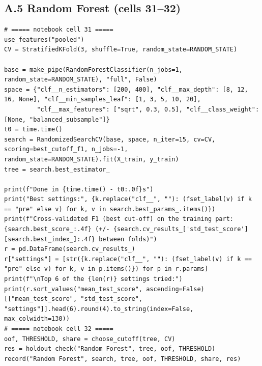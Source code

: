 \documentclass[12pt,a4paper]{article}
\begin{document}
\subsection*{A.5 Random Forest (cells 31--32)}
\begin{lstlisting}[style=code]
# ===== notebook cell 31 =====
use_features("pooled")
CV = StratifiedKFold(3, shuffle=True, random_state=RANDOM_STATE)

base = make_pipe(RandomForestClassifier(n_jobs=1, random_state=RANDOM_STATE), "full", False)
space = {"clf__n_estimators": [200, 400], "clf__max_depth": [8, 12, 16, None], "clf__min_samples_leaf": [1, 3, 5, 10, 20],
         "clf__max_features": ["sqrt", 0.3, 0.5], "clf__class_weight": [None, "balanced_subsample"]}
t0 = time.time()
search = RandomizedSearchCV(base, space, n_iter=15, cv=CV, scoring=best_cutoff_f1, n_jobs=-1, random_state=RANDOM_STATE).fit(X_train, y_train)
tree = search.best_estimator_

print(f"Done in {time.time() - t0:.0f}s")
print("Best settings:", {k.replace("clf__", ""): (fset_label(v) if k == "pre" else v) for k, v in search.best_params_.items()})
print(f"Cross-validated F1 (best cut-off) on the training part: {search.best_score_:.4f} (+/- {search.cv_results_['std_test_score'][search.best_index_]:.4f} between folds)")
r = pd.DataFrame(search.cv_results_)
r["settings"] = [str({k.replace("clf__", ""): (fset_label(v) if k == "pre" else v) for k, v in p.items()}) for p in r.params]
print(f"\nTop 6 of the {len(r)} settings tried:")
print(r.sort_values("mean_test_score", ascending=False)[["mean_test_score", "std_test_score", "settings"]].head(6).round(4).to_string(index=False, max_colwidth=130))
# ===== notebook cell 32 =====
oof, THRESHOLD, share = choose_cutoff(tree, CV)
res = holdout_check("Random Forest", tree, oof, THRESHOLD)
record("Random Forest", search, tree, oof, THRESHOLD, share, res)
\end{lstlisting}
\end{document}
